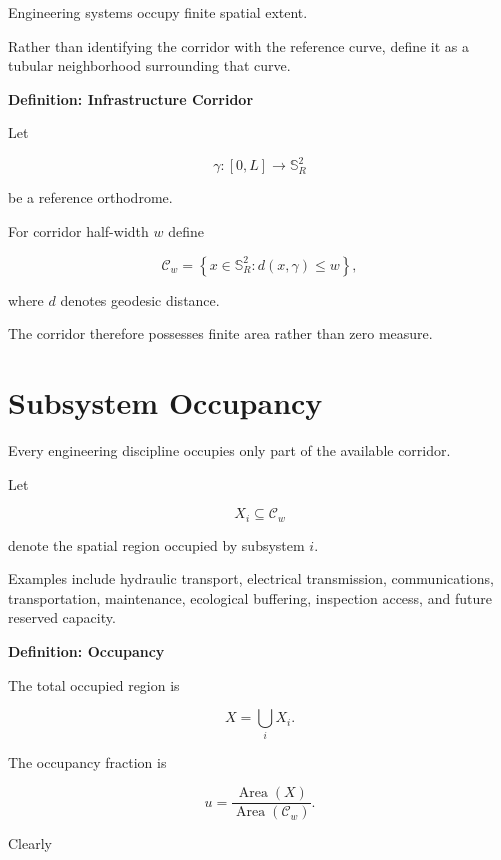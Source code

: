\documentclass[11pt,fleqn]{book}
\numberwithin{equation}{chapter}
\newenvironment{definition}[1]
  {\begin{definitionEnv}
   \noindent\textbf{Definition: #1}\par\smallskip}
  {\end{definitionEnv}}
\theoremstyle{plain}
\theoremstyle{definition}
\theoremstyle{remark}
\newcommand{\Sphere}{\mathbb{S}^{2}}
\begin{document}
Engineering systems occupy finite spatial extent.

Rather than identifying the corridor with the reference curve, define it
as a tubular neighborhood surrounding that curve.

\begin{definition}{Infrastructure Corridor}

Let

\[
\gamma:[0,L]\rightarrow\Sphere_R
\]

be a reference orthodrome.

For corridor half-width $w$ define

\[
\mathcal C_w
=
\left\{
x\in\Sphere_R
:
d(x,\gamma)\le w
\right\},
\]

where $d$ denotes geodesic distance.

\end{definition}

The corridor therefore possesses finite area rather than zero measure.


\section{Subsystem Occupancy}

Every engineering discipline occupies only part of the available
corridor.

Let

\[
X_i\subseteq\mathcal C_w
\]

denote the spatial region occupied by subsystem $i$.

Examples include hydraulic transport, electrical transmission,
communications, transportation, maintenance, ecological buffering,
inspection access, and future reserved capacity.


\begin{definition}{Occupancy}

The total occupied region is

\[
X
=
\bigcup_iX_i.
\]

The occupancy fraction is

\[
u
=
\frac{\operatorname{Area}(X)}
{\operatorname{Area}(\mathcal C_w)}.
\]

\end{definition}

Clearly
\end{document}
